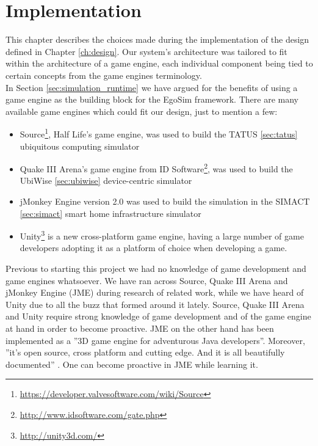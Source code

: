 \chapter{Implementation}\label{ch:implementation}
This chapter describes the choices made during the implementation of the design defined in Chapter \ref{ch:design}. Our system's architecture was tailored to fit within the architecture of a game engine, each individual component being tied to certain concepts from the game engines terminology.\\ 

In Section \ref{sec:simulation_runtime} we have argued for the benefits of using a game engine as the building block for the EgoSim framework. There are many available game engines which could fit our design, just to mention a few:
\begin{itemize}
	\item Source\footnote{\url{https://developer.valvesoftware.com/wiki/Source}}, Half Life's game engine, was used to build the TATUS \ref{sec:tatus} ubiquitous computing simulator
	\item Quake III Arena's game engine from ID Software\footnote{\url{http://www.idsoftware.com/gate.php}}, was used to build the UbiWise \ref{sec:ubiwise} device-centric simulator
	\item jMonkey Engine version 2.0 \cite{jme:online} was used to build the simulation in the SIMACT \ref{sec:simact} smart home infrastructure simulator
	\item Unity\footnote{\url{http://unity3d.com/}} is a new cross-platform game engine, having a large number of game developers adopting it as a platform of choice when developing a game.
\end{itemize}

Previous to starting this project we had no knowledge of game development and game engines whatsoever. We have ran across Source, Quake III Arena and jMonkey Engine (JME) during research of related work, while we have heard of Unity due to all the buzz that formed around it lately. Source, Quake III Arena and Unity require strong knowledge of game development and of the game engine at hand in order to become proactive. JME on the other hand has been implemented as a ''3D game engine for adventurous Java developers''. Moreover, ''it's open source, cross platform and cutting edge. And it is all beautifully documented'' \cite{jme:online}. One can become proactive in JME while learning it.\\

